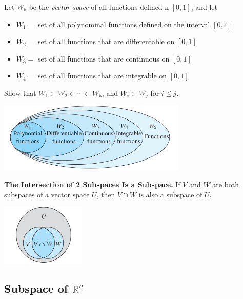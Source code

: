 \documentclass{article}
\newcommand\B{\textbf}
\newcommand\tcl{\begin{tcolorbox}[colback = {blue9}]}
\newcommand\etcl{\end{tcolorbox}}
\begin{document}
\begin{tcolorbox}
    Let $W_5$ be the \textit{vector space} of all functions defined n $[0, 1]$, and let 
    \begin{itemize}
        \item $W_1 =$ set of all polynominal functions defined on the interval $[0,1]$
        \item $W_2 =$ set of all functions that are differentable on $[0,1]$
        \item $W_3 =$ set of all functions that are continuous on $[0,1]$
        \item $W_4 =$ set of all functions that are integrable on $[0,1]$
    \end{itemize}
    Show that $W_1 \subset W_2 \subset \cdots \subset W_5$, and $W_i \subset W_j$ for $i \le j$.
    \begin{center}
        \includegraphics*[width = 9cm]{images/Wcalculus.png}
    \end{center}

    \tcl
        \B{The Intersection of 2 Subspaces Is a Subspace. }
        If $V$ and $W$ are both subspaces of a vector space $U$, then $V \cap W$ is also a subspace of $U$.
    \etcl 
    \begin{center}
        \includegraphics[width = 4cm]{images/VWintersection.png}
    \end{center}
    
    \subsection{Subspace of $\mathbb{R}^n$}
    

\end{tcolorbox}
\end{document}

